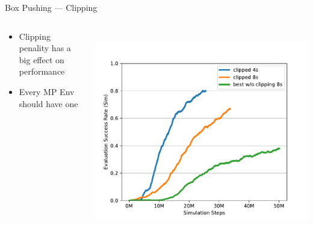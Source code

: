 \documentclass[16:9,en,navbarinfooter]{sdqbeamer}
\begin{document}
\begin{frame}{Box Pushing --- Clipping}
      
\begin{columns}       
     \begin{column}{0.4\textwidth}
        \vspace{1cm}
        \begin{itemize}
                \item Clipping penality has a big effect on performance
                \item Every MP Env should have one
        \end{itemize}
    \end{column}
    \begin{column}{0.6\textwidth}
        \vspace{.2cm} \\
        \includegraphics[width=\linewidth]{media/clipping_reward.pdf}

    \end{column}
\end{columns}       
\end{frame}


\backupend{}
\end{document}
